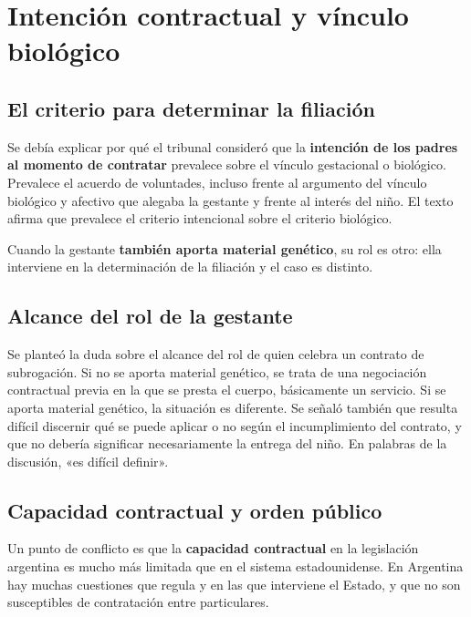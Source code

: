 \documentclass[12pt,oneside]{book}
\begin{document}
\chapter{Intención contractual y vínculo biológico}

\section{El criterio para determinar la filiación}

Se debía explicar por qué el tribunal consideró que la \textbf{intención de los padres al momento de contratar} prevalece sobre el vínculo gestacional o biológico. Prevalece el acuerdo de voluntades, incluso frente al argumento del vínculo biológico y afectivo que alegaba la gestante y frente al interés del niño. El texto afirma que prevalece el criterio intencional sobre el criterio biológico.

\begin{important}
Cuando la gestante \textbf{también aporta material genético}, su rol es otro: ella interviene en la determinación de la filiación y el caso es distinto.
\end{important}

\section{Alcance del rol de la gestante}

Se planteó la duda sobre el alcance del rol de quien celebra un contrato de subrogación. Si no se aporta material genético, se trata de una negociación contractual previa en la que se presta el cuerpo, básicamente un servicio. Si se aporta material genético, la situación es diferente. Se señaló también que resulta difícil discernir qué se puede aplicar o no según el incumplimiento del contrato, y que no debería significar necesariamente la entrega del niño. En palabras de la discusión, «es difícil definir».


\section{Capacidad contractual y orden público}

Un punto de conflicto es que la \textbf{capacidad contractual} en la legislación argentina es mucho más limitada que en el sistema estadounidense. En Argentina hay muchas cuestiones que regula y en las que interviene el Estado, y que no son susceptibles de contratación entre particulares.
\end{document}
